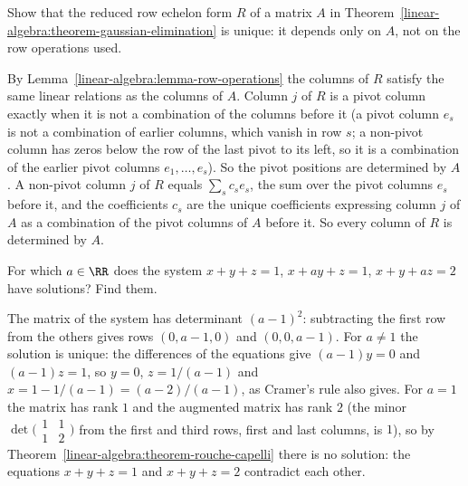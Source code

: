 \begin{exercise}\label{linear-algebra:exercise-rref-unique}
Show that the reduced row echelon form $R$ of a matrix $A$ in Theorem~\ref{linear-algebra:theorem-gaussian-elimination} is unique: it depends only on $A$, not on the row operations used.
\end{exercise}

\begin{solution}
By Lemma~\ref{linear-algebra:lemma-row-operations} the columns of $R$ satisfy the same linear relations as the columns of $A$. Column $j$ of $R$ is a pivot column exactly when it is not a combination
of the columns before it (a pivot column $e_s$ is not a combination of earlier columns, which vanish in row $s$; a non-pivot column has zeros below the row of the last pivot to its left, so it is a
combination of the earlier pivot columns $e_1, \ldots, e_s$). So the pivot positions are determined by $A$. A non-pivot column $j$ of $R$ equals $\sum_sc_se_s$, the sum over the pivot columns
$e_s$ before it, and the coefficients $c_s$ are the unique coefficients expressing column $j$ of $A$ as a combination of the pivot columns of $A$ before it. So every column of $R$ is determined by $A$.
\end{solution}

\begin{exercise}\label{linear-algebra:exercise-system-parameter}
For which $a \in \RR$ does the system $x + y + z = 1$, $x + ay + z = 1$, $x + y + az = 2$ have solutions? Find them.
\end{exercise}

\begin{solution}
The matrix of the system has determinant $(a - 1)^2$: subtracting the first row from the others gives rows $(0, a - 1, 0)$ and $(0, 0, a - 1)$. For $a \neq 1$ the solution is unique: the differences of
the equations give $(a - 1)y = 0$ and $(a - 1)z = 1$, so $y = 0$, $z = 1/(a - 1)$ and $x = 1 - 1/(a - 1) = (a - 2)/(a - 1)$, as Cramer's rule also gives. For $a = 1$ the matrix has rank $1$ and the
augmented matrix has rank $2$ (the minor $\det\bigl(\begin{smallmatrix}1 & 1\\ 1 & 2\end{smallmatrix}\bigr)$ from the first and third rows, first and last columns, is $1$), so by
Theorem~\ref{linear-algebra:theorem-rouche-capelli} there is no solution: the equations $x + y + z = 1$ and $x + y + z = 2$ contradict each other.
\end{solution}

